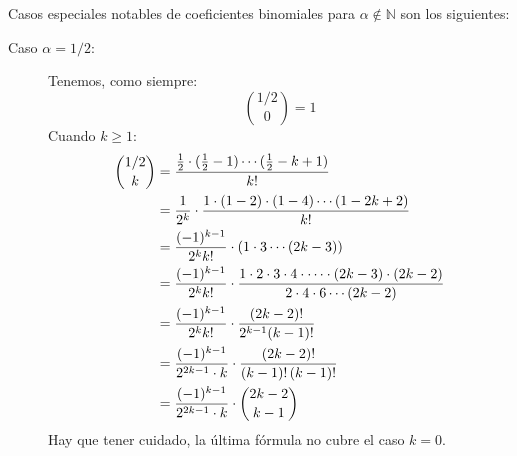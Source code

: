   Casos especiales notables de coeficientes binomiales
  para \(\alpha \notin \mathbb{N}\) son los siguientes:
  \begin{description}
  \item[\boldmath Caso \(\alpha = 1 / 2\):\unboldmath]
    Tenemos,
    como siempre:
    \begin{equation}
      \label{eq:binomial(1/2,0)}
      \binom{1/2}{0}
        = 1
    \end{equation}
    Cuando \(k \ge 1\):
    \begin{align}
      \binom{1/2}{k}
         &= \frac{\frac{1}{2} \cdot (\frac{1}{2}-1)
               \dotsm (\frac{1}{2} - k + 1)}{k!} \notag \\
         &= \frac{1}{2^k}
               \cdot \frac{1 \cdot (1 - 2) \cdot (1 - 4)
                             \dotsm (1 - 2 k + 2)}{k!} \notag \\
         &= \frac{(-1)^{k - 1}}{2^k k!}
               \cdot (1 \cdot 3 \dotsm (2 k - 3)) \notag \\
         &= \frac{(-1)^{k - 1}}{2^k k!}
               \cdot \frac{1 \cdot 2 \cdot 3 \cdot 4
                              \cdot \dotsm
                              \cdot (2 k - 3) \cdot (2 k - 2)}
                          {2 \cdot 4 \cdot 6 \dotsm (2 k - 2)}
                                \notag \\
         &= \frac{(-1)^{k - 1}}{2^k k!}
               \cdot \frac{(2 k - 2)!}{2^{k - 1} (k - 1)!}
                  \notag \\
         &= \frac{(-1)^{k - 1}}{2^{2 k - 1} \cdot k}
               \cdot \frac{(2 k - 2)!}{(k - 1)! \, (k - 1)!}
                  \notag \\
         &= \frac{(-1)^{k - 1}}{2^{2 k - 1} \cdot k}
               \cdot \binom{2 k - 2}{k - 1}
            \label{eq:binomial(1/2,k)}
    \end{align}
    Hay que tener cuidado,
    la última fórmula no cubre el caso \(k = 0\).


\end{description}
